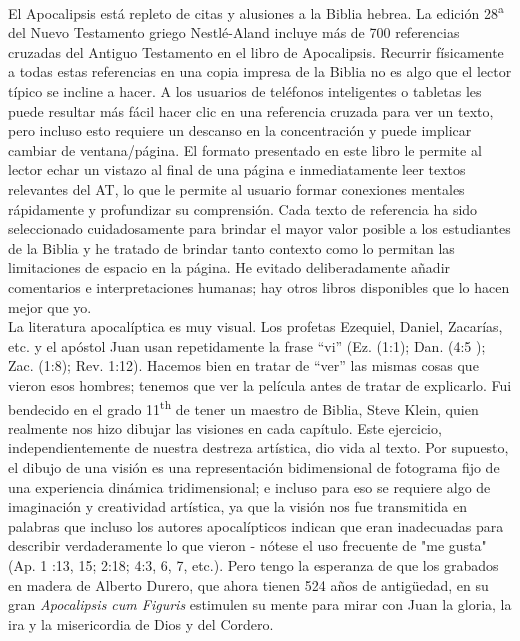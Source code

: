El Apocalipsis está repleto de citas y alusiones a la Biblia hebrea. La edición 28\textsuperscript{a} del Nuevo Testamento griego Nestlé-Aland incluye más de 700 referencias cruzadas del Antiguo Testamento en el libro de Apocalipsis. Recurrir físicamente a todas estas referencias en una copia impresa de la Biblia no es algo que el lector típico se incline a hacer. A los usuarios de teléfonos inteligentes o tabletas les puede resultar más fácil hacer clic en una referencia cruzada para ver un texto, pero incluso esto requiere un descanso en la concentración y puede implicar cambiar de ventana/página. El formato presentado en este libro le permite al lector echar un vistazo al final de una página e inmediatamente leer textos relevantes del AT, lo que le permite al usuario formar conexiones mentales rápidamente y profundizar su comprensión. Cada texto de referencia ha sido seleccionado cuidadosamente para brindar el mayor valor posible a los estudiantes de la Biblia y he tratado de brindar tanto contexto como lo permitan las limitaciones de espacio en la página. He evitado deliberadamente añadir comentarios e interpretaciones humanas; hay otros libros disponibles que lo hacen mejor que yo.\\

La literatura apocalíptica es muy visual. Los profetas Ezequiel, Daniel, Zacarías, etc. y el apóstol Juan usan repetidamente la frase “vi” (Ez. (1:1); Dan. (4:5 ); Zac. (1:8); Rev. 1:12). Hacemos bien en tratar de ``ver'' las mismas cosas que vieron esos hombres; tenemos que ver la película antes de tratar de explicarlo. Fui bendecido en el grado 11\textsuperscript{th} de tener un maestro de Biblia, Steve Klein, quien realmente nos hizo dibujar las visiones en cada capítulo. Este ejercicio, independientemente de nuestra destreza artística, dio vida al texto. Por supuesto, el dibujo de una visión es una representación bidimensional de fotograma fijo de una experiencia dinámica tridimensional; e incluso para eso se requiere algo de imaginación y creatividad artística, ya que la visión nos fue transmitida en palabras que incluso los autores apocalípticos indican que eran inadecuadas para describir verdaderamente lo que vieron - nótese el uso frecuente de "me gusta" (Ap. 1 :13, 15; 2:18; 4:3, 6, 7, etc.). Pero tengo la esperanza de que los grabados en madera de Alberto Durero, que ahora tienen 524 años de antigüedad, en su gran \textit{Apocalipsis cum Figuris} estimulen su mente para mirar con Juan la gloria, la ira y la misericordia de Dios y del Cordero.\\

